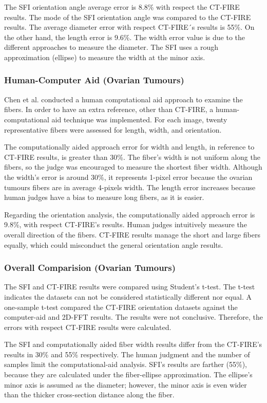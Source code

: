 \documentclass[12pt,a4paper]{article}
\begin{document}
The SFI orientation angle average error is 8.8\% with respect the CT-FIRE results. The mode of the SFI orientation angle was compared to the CT-FIRE results. The average diameter error with respect CT-FIRE´s results is 55\%.  On the other hand, the length error is 9.6\%. The width error value is due to the different approaches to measure the diameter. The SFI uses a rough approximation (ellipse) to measure the width at the minor axis.

\subsubsection{Human-Computer Aid (Ovarian Tumours) }
Chen et al. conducted a human computational aid approach to examine the fibers. In order to have an extra reference, other than CT-FIRE, a human-computational aid technique was implemented. For each image,  twenty representative fibers were assessed for length, width, and orientation.

The computationally aided approach error for width and length, in reference to CT-FIRE results, is greater than 30\%.  The fiber's width is not uniform along the fibers, so the judge was encouraged to measure the shortest fiber width. Although the width's error is around 30\%, it represents 1-pixel error because the ovarian tumours fibers are in average 4-pixels width. The length error increases because human judges have a bias to measure long fibers, as it is easier.

Regarding the orientation analysis, the computationally aided approach error is 9.8\%, with respect CT-FIRE’s results. Human judges intuitively measure the overall direction of the fibers. CT-FIRE results manage the short and large fibers equally, which could misconduct the general orientation angle results.

\subsubsection{Overall Comparision (Ovarian Tumours)  }

The SFI and CT-FIRE results were compared using Student’s t-test. The t-test indicates the datasets can not be considered statistically different nor equal. A one-sample t-test compared the CT-FIRE orientation datasets against the computer-aid and 2D-FFT results. The results were not conclusive. Therefore, the errors with respect CT-FIRE results were calculated. 

The SFI and computationally aided fiber width results differ from the CT-FIRE’s results in 30\% and 55\% respectively. The human judgment and the number of samples limit the computational-aid analysis. SFI’s results are farther (55\%), because they are calculated under the fiber-ellipse approximation. The ellipse’s minor axis is assumed as the diameter; however, the minor axis is even wider than the thicker cross-section distance along the fiber.
\end{document}
